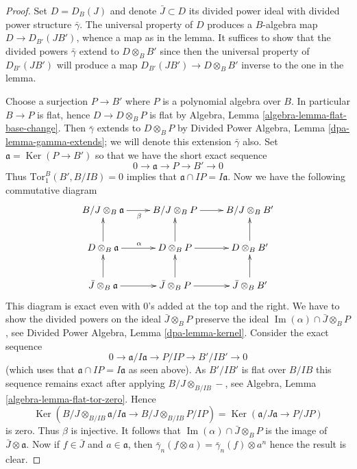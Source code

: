 \documentclass{stacks-project}
\theoremstyle{plain}
\theoremstyle{definition}
\theoremstyle{remark}
\numberwithin{equation}{subsection}
\def\Ker{\mathop{\mathrm{Ker}}}
\def\Im{\mathop{\mathrm{Im}}}
\begin{document}
\begin{proof}
Set $D = D_B(J)$ and denote $\bar J \subset D$ its divided power ideal
with divided power structure $\bar\gamma$. The universal property of
$D$ produces a $B$-algebra map $D \to D_{B'}(JB')$, whence a map as in
the lemma. It suffices to show that
the divided powers $\bar\gamma$ extend to $D \otimes_B B'$ since then
the universal property of $D_{B'}(JB')$ will produce a map
$D_{B'}(JB') \to D \otimes_B B'$ inverse to the one in the lemma.

\medskip\noindent
Choose a surjection $P \to B'$ where $P$ is a polynomial algebra over $B$.
In particular $B \to P$ is flat, hence $D \to D \otimes_B P$ is flat by
Algebra, Lemma \ref{algebra-lemma-flat-base-change}.
Then $\bar\gamma$ extends to $D \otimes_B P$ by
Divided Power Algebra, Lemma \ref{dpa-lemma-gamma-extends}; we
will denote this extension
$\bar\gamma$ also. Set $\mathfrak a = \Ker(P \to B')$ so that
we have the short exact sequence
$$
0 \to \mathfrak a \to P \to B' \to 0
$$
Thus $\text{Tor}_1^B(B', B/IB) = 0$ implies that
$\mathfrak a \cap IP = I\mathfrak a$.
Now we have the following commutative diagram
$$
\xymatrix{
B/J \otimes_B \mathfrak a \ar[r]_\beta &
B/J \otimes_B P \ar[r] &
B/J \otimes_B B' \\
D \otimes_B \mathfrak a \ar[r]^\alpha \ar[u] &
D \otimes_B P \ar[r] \ar[u] &
D \otimes_B B' \ar[u] \\
\bar J \otimes_B \mathfrak a \ar[r] \ar[u] &
\bar J \otimes_B P \ar[r] \ar[u] &
\bar J \otimes_B B' \ar[u]
}
$$
This diagram is exact even with $0$'s added at the top and the right.
We have to show the divided powers on the ideal
$\bar J \otimes_B P$ preserve the ideal
$\Im(\alpha) \cap \bar J \otimes_B P$, see
Divided Power Algebra, Lemma \ref{dpa-lemma-kernel}.
Consider the exact sequence
$$
0 \to \mathfrak a/I\mathfrak a \to P/IP \to B'/IB' \to 0
$$
(which uses that $\mathfrak a \cap IP = I\mathfrak a$ as seen above).
As $B'/IB'$ is flat over $B/IB$ this sequence remains exact after
applying $B/J \otimes_{B/IB} -$, see
Algebra, Lemma \ref{algebra-lemma-flat-tor-zero}. Hence
$$
\Ker(B/J \otimes_{B/IB} \mathfrak a/I\mathfrak a \to
B/J \otimes_{B/IB} P/IP) =
\Ker(\mathfrak a/J\mathfrak a \to P/JP)
$$
is zero. Thus $\beta$ is injective. It follows that
$\Im(\alpha) \cap \bar J \otimes_B P$ is the
image of $\bar J \otimes \mathfrak a$. Now if
$f \in \bar J$ and $a \in \mathfrak a$, then
$\bar\gamma_n(f \otimes a) = \bar\gamma_n(f) \otimes a^n$
hence the result is clear.
\end{proof}
\end{document}
